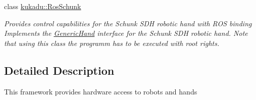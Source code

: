 \begin{DoxyCompactItemize}
class \hyperlink{classkukadu_1_1RosSchunk}{kukadu\-::\-Ros\-Schunk}
\begin{DoxyCompactList}\small\item\em Provides control capabilities for the Schunk S\-D\-H robotic hand with R\-O\-S binding Implements the \hyperlink{classkukadu_1_1GenericHand}{Generic\-Hand} interface for the Schunk S\-D\-H robotic hand. Note that using this class the programm has to be executed with root rights. \end{DoxyCompactList}\end{DoxyCompactItemize}


\subsection{Detailed Description}
This framework provides hardware access to robots and hands 